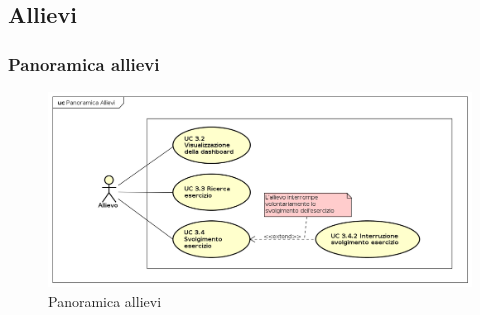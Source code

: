 \subsection{Allievi}
\subsubsection{Panoramica allievi}

\begin{figure}[H]
\centering
\includegraphics[width=17cm]{img/PanoramicaAllievi.png} 
\caption{Panoramica allievi}\label{fig:31}
\end{figure}


